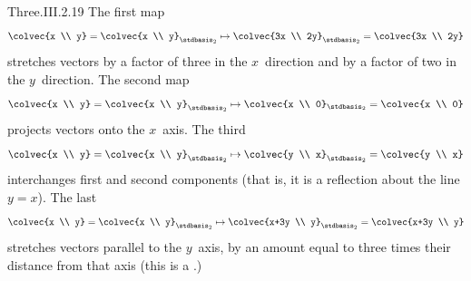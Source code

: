 \begin{ans}{Three.III.2.19}
      The first map
      \begin{equation*}
        \colvec{x \\ y}=\colvec{x \\ y}_{\stdbasis_2}
        \mapsto
        \colvec{3x \\ 2y}_{\stdbasis_2}=\colvec{3x \\ 2y}
      \end{equation*}
      stretches vectors by a factor of three in the
      \( x \)~direction and by a factor of two in the \( y \)~direction.
      The second map
      \begin{equation*}
        \colvec{x \\ y}=\colvec{x \\ y}_{\stdbasis_2}
        \mapsto
        \colvec{x \\ 0}_{\stdbasis_2}=\colvec{x \\ 0}
      \end{equation*}
      projects vectors onto the \( x \)~axis.
      The third
      \begin{equation*}
        \colvec{x \\ y}=\colvec{x \\ y}_{\stdbasis_2}
        \mapsto
        \colvec{y \\ x}_{\stdbasis_2}=\colvec{y \\ x}
      \end{equation*}
      interchanges first and second components
      (that is, it is a reflection about the line \( y=x \)).
      The last
      \begin{equation*}
        \colvec{x \\ y}=\colvec{x \\ y}_{\stdbasis_2}
        \mapsto
        \colvec{x+3y \\ y}_{\stdbasis_2}=\colvec{x+3y \\ y}
      \end{equation*}
      stretches vectors parallel to the \( y \)~axis, by an amount
      equal to three times their distance from that axis
      (this is a .)
     
\end{ans}
